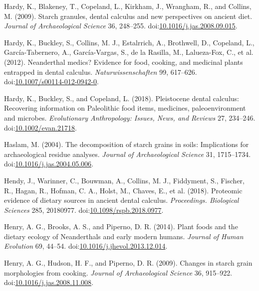 \documentclass[utf8]{frontiers/frontiersSCNS}
\newlength{\cslhangindent}
\newlength{\cslentryspacingunit} %
\newenvironment{CSLReferences}[2] %
 {%
  \setlength{\parindent}{0pt}
  \ifodd #1
  \let\oldpar\par
  \def\par{\hangindent=\cslhangindent\oldpar}
  \fi
  \setlength{\parskip}{#2\cslentryspacingunit}
 }%
 {}
\begin{document}
\begin{CSLReferences}{1}{0}
\leavevmode{}%
Hardy, K., Blakeney, T., Copeland, L., Kirkham, J., Wrangham, R., and Collins, M. (2009). Starch granules, dental calculus and new perspectives on ancient diet. \emph{Journal of Archaeological Science} 36, 248--255. doi:\href{https://doi.org/10.1016/j.jas.2008.09.015}{10.1016/j.jas.2008.09.015}.

\leavevmode{}%
Hardy, K., Buckley, S., Collins, M. J., Estalrrich, A., Brothwell, D., Copeland, L., García-Tabernero, A., García-Vargas, S., de la Rasilla, M., Lalueza-Fox, C., et al. (2012). Neanderthal medics? {Evidence} for food, cooking, and medicinal plants entrapped in dental calculus. \emph{Naturwissenschaften} 99, 617--626. doi:\href{https://doi.org/10.1007/s00114-012-0942-0}{10.1007/s00114-012-0942-0}.

\leavevmode{}%
Hardy, K., Buckley, S., and Copeland, L. (2018). Pleistocene dental calculus: {Recovering} information on {Paleolithic} food items, medicines, paleoenvironment and microbes. \emph{Evolutionary Anthropology: Issues, News, and Reviews} 27, 234--246. doi:\href{https://doi.org/10.1002/evan.21718}{10.1002/evan.21718}.

\leavevmode{}%
Haslam, M. (2004). The decomposition of starch grains in soils: Implications for archaeological residue analyses. \emph{Journal of Archaeological Science} 31, 1715--1734. doi:\href{https://doi.org/10.1016/j.jas.2004.05.006}{10.1016/j.jas.2004.05.006}.

\leavevmode{}%
Hendy, J., Warinner, C., Bouwman, A., Collins, M. J., Fiddyment, S., Fischer, R., Hagan, R., Hofman, C. A., Holst, M., Chaves, E., et al. (2018). Proteomic evidence of dietary sources in ancient dental calculus. \emph{Proceedings. Biological Sciences} 285, 20180977. doi:\href{https://doi.org/10.1098/rspb.2018.0977}{10.1098/rspb.2018.0977}.

\leavevmode{}%
Henry, A. G., Brooks, A. S., and Piperno, D. R. (2014). Plant foods and the dietary ecology of {Neanderthals} and early modern humans. \emph{Journal of Human Evolution} 69, 44--54. doi:\href{https://doi.org/10.1016/j.jhevol.2013.12.014}{10.1016/j.jhevol.2013.12.014}.

\leavevmode{}%
Henry, A. G., Hudson, H. F., and Piperno, D. R. (2009). Changes in starch grain morphologies from cooking. \emph{Journal of Archaeological Science} 36, 915--922. doi:\href{https://doi.org/10.1016/j.jas.2008.11.008}{10.1016/j.jas.2008.11.008}.


\end{CSLReferences}
\end{document}
